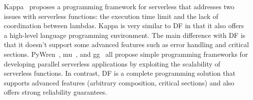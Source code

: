 %
%
Kappa~\cite{zhang2020kappa} proposes a programming framework for serverless that addresses two issues with serverless functions: the execution time limit and the lack of coordination between lambdas. Kappa is very similar to DF in that it also offers a high-level language programming environment. The main difference with DF is that it doesn't support some advanced features such as error handling and critical sections.
%
PyWren~\cite{jonas2017occupy}, mu~\cite{fouladi2017encoding}, and gg~\cite{fouladi2019laptop} all propose simple programming frameworks for developing parallel serverless applications by exploiting the scalability of serverless functions. In contrast, DF is a complete programming solution that supports advanced features (arbitrary composition, critical sections) and also offers strong reliability guarantees.




